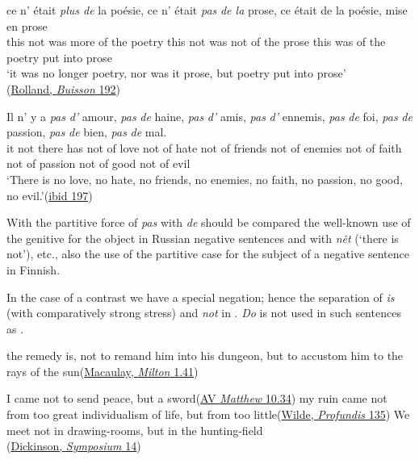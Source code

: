 \ea \label{ex:05-04}
 \gll ce n' était \textit{plus de} la poésie, ce n' était \textit{pas} \textit{de la} prose, ce était de la poésie, mise en prose\\
 this not was {more of} the poetry this not was not {of the} prose this was of the poetry put into prose\\
 \glt `it was no longer poetry, nor was it prose, but poetry put into prose'\\\hfill(\href{https://www.gutenberg.org/cache/epub/62021/pg62021-images.html}{Rolland, \textit{Buisson} 192})
\z

\ea \label{ex:05-05}
 \gll Il n' y a \textit{pas} \textit{d'} amour, \textit{pas} \textit{de} haine, \textit{pas} \textit{d'} amis, \textit{pas} \textit{d'} ennemis, \textit{pas} \textit{de} foi, \textit{pas} \textit{de} passion, \textit{pas} \textit{de} bien, \textit{pas} \textit{de} mal.\\
 it not there has not of love not of hate not of friends not of enemies not of faith not of passion not of good not of evil\\
 \glt `There is no love, no hate, no friends, no enemies, no faith, no passion, no good, no evil.'\hfill(\href{https://www.gutenberg.org/cache/epub/62021/pg62021-images.html}{ibid 197})
\z

With the partitive force of \textit{pas} with \textit{de} should be compared the well-known use of the genitive for the object in Russian negative sentences and with \textit{nět} (`there is not'), etc., also the use of the partitive case for the subject of a negative sentence in Finnish. %

In the case of a contrast we have a special negation; hence the separation of \textit{is} (with comparatively strong stress) and \textit{not} in . \textit{Do} is not used in such sentences as .

\ea \label{ex:05-06}
the remedy is, not to remand him into his dungeon, but to accustom him to the rays of the sun\hfill(\href{https://archive.org/details/essaysonmiltona05macagoog/page/n128/mode/2up?view=theater&q=remand}{Macaulay, \textit{Milton} 1.41})
\z

\ea \label{ex:05-07}
\ea
I came not to send peace, but a sword\hfill(\href{https://www.kingjamesbibleonline.org/1611_Matthew-10-34/}{AV \textit{Matthew} 10.34})
\ex
my ruin came not from too great individualism of life, but from too little\hfill(\href{https://archive.org/details/deprofundiswilde00wildiala/page/104/mode/2up?q=%22great+individualism+of+life%22&view=theater}{Wilde, \textit{Profundis} 135})
\ex
We meet not in drawing-rooms, but in the hunting-field\\\hfill(\href{https://www.gutenberg.org/files/30432/30432-h/30432-h.htm}{Dickinson, \textit{Symposium} 14})
\z
\z

